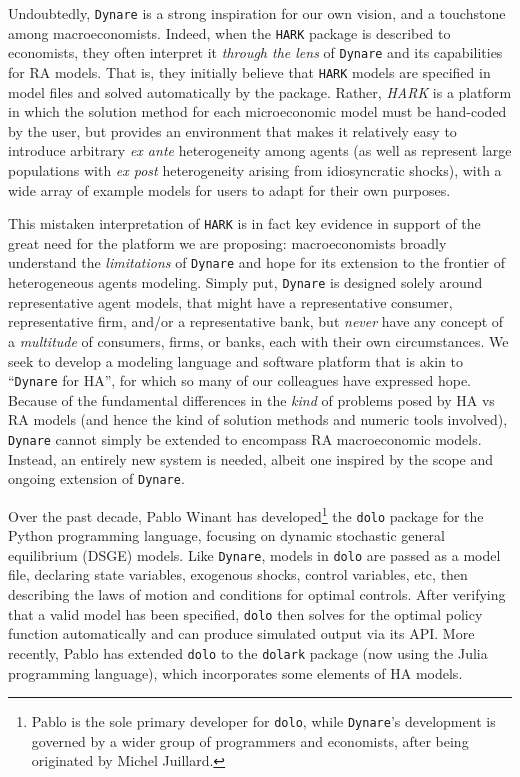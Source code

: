 \documentclass[12pt,pdftex,letterpaper]{article}
\begin{document}
Undoubtedly, \texttt{Dynare} is a strong inspiration for our own vision, and a touchstone among macroeconomists. Indeed, when the \texttt{HARK} package is described to economists, they often interpret it \textit{through the lens} of \texttt{Dynare} and its capabilities for RA models. That is, they initially believe that \texttt{HARK} models are specified in model files and solved automatically by the package. Rather, \textit{HARK} is a platform in which the solution method for each microeconomic model must be hand-coded by the user, but provides an environment that makes it relatively easy to introduce arbitrary \textit{ex ante} heterogeneity among agents (as well as represent large populations with \textit{ex post} heterogeneity arising from idiosyncratic shocks), with a wide array of example models for users to adapt for their own purposes.

This mistaken interpretation of \texttt{HARK} is in fact key evidence in support of the great need for the platform we are proposing: macroeconomists broadly understand the \textit{limitations} of \texttt{Dynare} and hope for its extension to the frontier of heterogeneous agents modeling. Simply put, \texttt{Dynare} is designed solely around representative agent models, that might have a representative consumer, representative firm, and/or a representative bank, but \textit{never} have any concept of a \textit{multitude} of consumers, firms, or banks, each with their own circumstances. We seek to develop a modeling language and software platform that is akin to ``\texttt{Dynare} for HA'', for which so many of our colleagues have expressed hope. Because of the fundamental differences in the \textit{kind} of problems posed by HA vs RA models (and hence the kind of solution methods and numeric tools involved), \texttt{Dynare} cannot simply be extended to encompass RA macroeconomic models. Instead, an entirely new system is needed, albeit one inspired by the scope and ongoing extension of \texttt{Dynare}.

Over the past decade, Pablo Winant has developed\footnote{Pablo is the sole primary developer for \texttt{dolo}, while \texttt{Dynare}'s development is governed by a wider group of programmers and economists, after being originated by Michel Juillard.} the \texttt{dolo} package for the Python programming language, focusing on dynamic stochastic general equilibrium (DSGE) models. Like \texttt{Dynare}, models in \texttt{dolo} are passed as a model file, declaring state variables, exogenous shocks, control variables, etc, then describing the laws of motion and conditions for optimal controls. After verifying that a valid model has been specified, \texttt{dolo} then solves for the optimal policy function automatically and can produce simulated output via its API. More recently, Pablo has extended \texttt{dolo} to the \texttt{dolark} package (now using the Julia programming language), which incorporates some elements of HA models.
\end{document}

